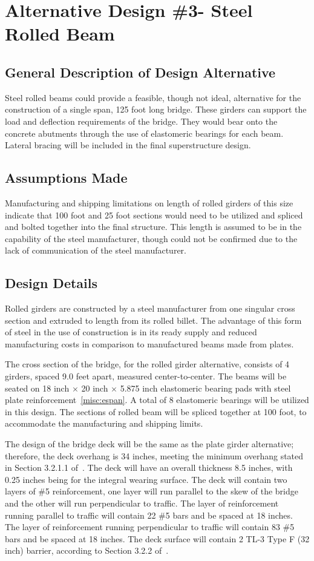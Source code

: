 \chapter{Alternative Design \#3- Steel Rolled Beam}


\section{General Description of Design Alternative}
Steel rolled beams could provide a feasible, though not ideal, alternative for the construction of a single span, 125 foot long bridge.  These girders can support the load and deflection requirements of the bridge. They would bear onto the concrete abutments through the use of elastomeric bearings for each beam. Lateral bracing will be included in the final superstructure design.


\section{Assumptions Made}
Manufacturing and shipping limitations on length of rolled girders of this size indicate that 100 foot and 25 foot sections would need to be utilized and spliced and bolted together into the final structure.  This length is assumed to be in the capability of the steel manufacturer, though could not be confirmed due to the lack of communication of the steel manufacturer.


\section{Design Details}
Rolled girders are constructed by a steel manufacturer from one singular cross section and extruded to length from its rolled billet. The advantage of this form of steel in the use of construction is in its ready supply and reduced manufacturing costs in comparison to manufactured beams made from plates.

The cross section of the bridge, for the rolled girder alternative, consists of 4 girders, spaced 9.0 feet apart, measured center-to-center. The beams will be seated on 18 inch \(\times\) 20 inch \(\times\) 5.875 inch elastomeric bearing pads with steel plate reinforcement~\ref{misc:espan}. A total of 8 elastomeric bearings will be utilized in this design. The sections of rolled beam will be spliced together at 100 foot, to accommodate the manufacturing and shipping limits.

The design of the bridge deck will be the same as the plate girder alternative; therefore, the deck overhang is 34 inches, meeting the minimum overhang stated in Section 3.2.1.1 of~\cite{bridgedesignman}. The deck will have an overall thickness 8.5 inches, with 0.25 inches being for the integral wearing surface. The deck will contain two layers of \#5 reinforcement, one layer will run parallel to the skew of the bridge and the other will run perpendicular to traffic. The layer of reinforcement running parallel to traffic will contain 22 \#5 bars and be spaced at 18 inches. The layer of reinforcement running perpendicular to traffic will contain 83 \#5 bars and be spaced at 18 inches. The deck surface will contain 2 TL-3 Type F (32 inch) barrier, according to Section 3.2.2 of~\cite{bridgedesignman}.

